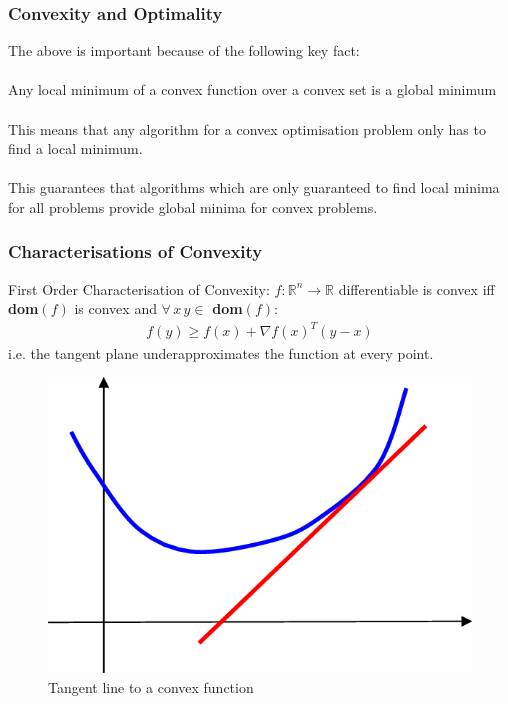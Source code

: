 \documentclass{beamer}
\def\rnum{\mathbb{R}}
\begin{document}
\begin{frame}
    \frametitle{Convexity and Optimality}
    The above is important because of the following key fact:
    \\~\\
    Any local minimum of a convex function over a convex set is a global
    minimum
    \\~\\
    This means that any algorithm for a convex optimisation problem only has to
    find a local minimum.
    \\~\\
    This guarantees that algorithms which are only
    guaranteed to find local minima for all problems provide global minima for
    convex problems.
\end{frame}

\begin{frame}
    \frametitle{Characterisations of Convexity}
    First Order Characterisation of Convexity: $f : \rnum^{n} \rightarrow \rnum$
    differentiable is convex iff \textbf{dom}$(f)$ is convex and $\forall \, x
    \, y \in$ \textbf{dom}$(f)$:
    \begin{align*}
        f(y) \geq f(x) + \nabla f(x)^{T}(y-x)
    \end{align*}
    i.e. the tangent plane underapproximates the function at every point.
    \begin{figure}[t]
        \centering
        \includegraphics[scale=0.2]{tangent}
        \caption{Tangent line to a convex function}
        \label{fig:tangent}
    \end{figure}
\end{frame}
\end{document}

